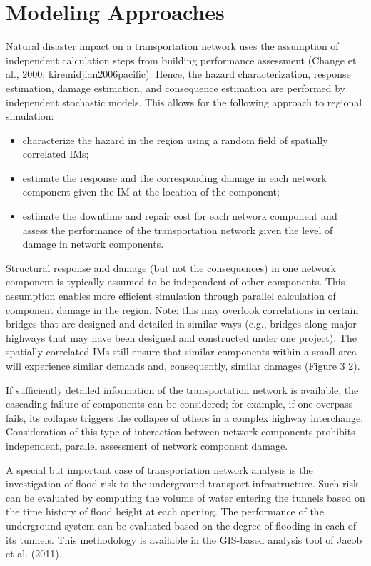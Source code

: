 \section{Modeling Approaches}
\label{sec:perf_transport_methods}

Natural disaster impact on a transportation network uses the assumption of independent calculation steps from building performance assessment (Change et al., 2000; kiremidjian2006pacific). Hence, the hazard characterization, response estimation, damage estimation, and consequence estimation are performed by independent stochastic models. This allows for the following approach to regional simulation:

\begin{itemize}
    \item characterize the hazard in the region using a random field of spatially correlated IMs;
    \item estimate the response and the corresponding damage in each network component given the IM at the location of the component;
    \item estimate the downtime and repair cost for each network component and assess the performance of the transportation network given the level of damage in network components.
\end{itemize}

Structural response and damage (but not the consequences) in one network component is typically assumed to be independent of other components. This assumption enables more efficient simulation through parallel calculation of component damage in the region. Note: this may overlook correlations in certain bridges that are designed and detailed in similar ways (e.g., bridges along major highways that may have been designed and constructed under one project). The spatially correlated IMs still ensure that similar components within a small area will experience similar demands and, consequently, similar damages (Figure 3 2).

If sufficiently detailed information of the transportation network is available, the cascading failure of components can be considered; for example, if one overpass fails, its collapse triggers the collapse of others in a complex highway interchange. Consideration of this type of interaction between network components prohibits independent, parallel assessment of network component damage.

A special but important case of transportation network analysis is the investigation of flood risk to the underground transport infrastructure. Such risk can be evaluated by computing the volume of water entering the tunnels based on the time history of flood height at each opening. The performance of the underground system can be evaluated based on the degree of flooding in each of its tunnels. This methodology is available in the GIS-based analysis tool of Jacob et al. (2011).

